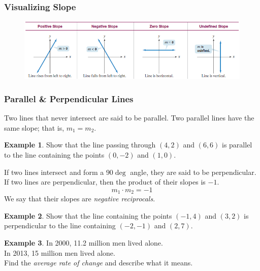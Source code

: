 \documentclass[addpoints,12pt]{exam}
\theoremstyle{definition}
\theoremstyle{break}
\theoremstyle{break}
\newtheorem{example}{Example}[subsection]
\begin{document}
\newpage

\subsubsection*{Visualizing Slope}
\begin{figure}[h]
\centering
\includegraphics[scale=.8]{../images/types_of_slope}
\end{figure}

\vspace{.15in}

\subsubsection*{Parallel \& Perpendicular Lines}
\vspace{.15in}

\begin{definition}
Two lines that never intersect are said to be parallel. Two parallel lines have the same slope; that is, $m_1 = m_2$.
\end{definition}

\vspace{.15in}

\begin{example}
Show that the line passing through $(4,2)$ and $(6,6)$ is parallel to the line containing the points $(0,-2)$ and $(1,0)$.
\end{example}

\newpage

\begin{definition}
If two lines intersect and form a $90\deg$ angle, they are said to be perpendicular. If two lines are perpendicular, then the product of their slopes is $-1$.
\[m_1\cdot m_2 = -1\]
We say that their slopes are \emph{negative reciprocals}.
\end{definition}

\vspace{.15in}

\begin{example}
Show that the line containing the points $(-1,4)$ and $(3,2)$ is perpendicular to the line containing $(-2,-1)$ and $(2,7)$.
\vspace{1.5in}
\end{example}

\begin{example}
In 2000, 11.2 million men lived alone.\\
In 2013, 15 million men lived alone.\\
Find the \emph{average rate of change} and describe what it means.
\end{example}
\end{document}
